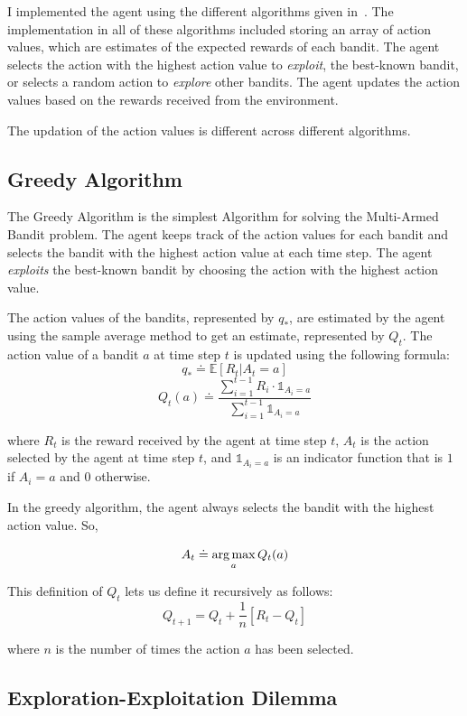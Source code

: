 I implemented the agent using the different algorithms given in~\cite{sutton2018reinforcement}. The implementation in all of these algorithms included storing an array of action values, which are estimates of the expected rewards of each bandit. The agent selects the action with the highest action value to \textit{exploit}, the best-known bandit, or selects a random action to \textit{explore} other bandits. The agent updates the action values based on the rewards received from the environment.

The updation of the action values is different across different algorithms.

\subsection{Greedy Algorithm}

The Greedy Algorithm is the simplest Algorithm for solving the Multi-Armed Bandit problem. The agent keeps track of the action values for each bandit and selects the bandit with the highest action value at each time step. The agent \textit{exploits} the best-known bandit by choosing the action with the highest action value.

The action values of the bandits, represented by $q_{\ast}$, are estimated by the agent using the sample average method to get an estimate, represented by $Q_t$. The action value of a bandit $a$ at time step $t$ is updated using the following formula:
\[q_\ast\doteq \mathds{E} [R_t|A_t=a]\]
\[Q_t(a)\doteq \frac{\sum_{i=1}^{t-1} R_i \cdot \mathds{1}_{A_i=a}}{\sum_{i=1}^{t-1} \mathds{1}_{A_i=a}}\]

where $R_t$ is the reward received by the agent at time step $t$, $A_t$ is the action selected by the agent at time step $t$, and $\mathds{1}_{A_i=a}$ is an indicator function that is $1$ if $A_i=a$ and $0$ otherwise.

In the greedy algorithm, the agent always selects the bandit with the highest action value. So,

\[A_t \doteq \operatorname*{arg\,max}_{a} Q_t(a)\]

This definition of $Q_t$ lets us define it recursively as follows:
\[Q_{t+1} = Q_t + \frac{1}{n}[R_t - Q_t]\]

where $n$ is the number of times the action $a$ has been selected.

\subsection{Exploration-Exploitation Dilemma}

